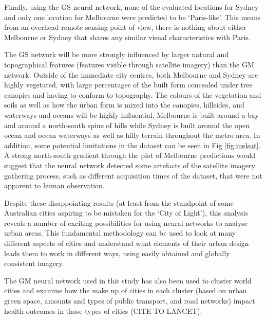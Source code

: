 \documentclass[10pt,letterpaper,hidelinks]{article}
\begin{document}
Finally, using the GS neural network, none of the evaluated locations for Sydney and only one location for Melbourne were predicted to be `Paris-like'. This means from an overhead remote sensing point of view, there is nothing about either Melbourne or Sydney that shares any similar visual characteristics with Paris.

The GS network will be more strongly influenced by larger natural and topographical features (features visible through satellite imagery) than the GM network. Outside of the immediate city centres, both Melbourne and Sydney are highly vegetated, with large percentages of the built form concealed under tree canopies and having to conform to topography. The colours of the vegetation and soils as well as how the urban form is mixed into the canopies, hillsides, and waterways and oceans will be highly influential. Melbourne is built around a bay and around a north-south spine of hills while Sydney is built around the open ocean and ocean waterways as well as hilly terrain throughout the metro area. In addition, some potential limitations in the dataset can be seen in Fig \ref{fig:melsat}. A strong north-south gradient through the plot of Melbourne predictions would suggest that the neural network detected some artefacts of the satellite imagery gathering process, such as different acquisition times of the dataset, that were not apparent to human observation. 

Despite these disappointing results (at least from the standpoint of some Australian cities aspiring to be mistaken for the `City of Light'), this analysis reveals a number of exciting possibilities for using neural networks to analyse urban areas. This fundamental methodology can be used to look at many different aspects of cities and understand what elements of their urban design leads them to work in different ways, using easily obtained and globally consistent imagery. 

The GM neural network used in this study has also been used to cluster world cities and examine how the make up of cities in each cluster (based on urban green space, amounts and types of public transport, and road networks) impact health outcomes in those types of cities (CITE TO LANCET). 

\end{document}
